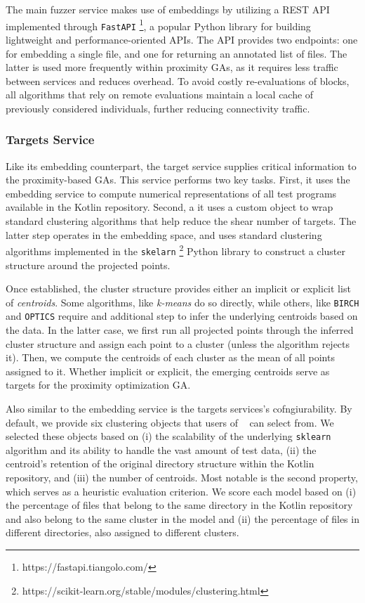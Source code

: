 The main fuzzer service makes use of embeddings
by utilizing a REST API implemented through \texttt{FastAPI}
\footnote{https://fastapi.tiangolo.com/}, a popular Python library
for building lightweight and performance-oriented APIs.
The API provides two endpoints: one for embedding a single file,
and one for returning an annotated list of files.
The latter is used more frequently within proximity \gls{GA}s,
as it requires less traffic between services and reduces overhead.
To avoid costly re-evaluations of blocks,
all algorithms that rely on remote evaluations maintain
a local cache of previously considered individuals,
further reducing connectivity traffic.

\subsubsection{Targets Service}

Like its embedding counterpart, the target service supplies
critical information to the proximity-based \gls{GA}s.
This service performs two key tasks.
First, it uses the embedding service to compute numerical representations
of all test programs available in the Kotlin repository.
Second, a it uses a custom object to wrap standard clustering algorithms that
help reduce the shear number of targets.
The latter step operates in the embedding space,
and uses standard clustering algorithms implemented in the 
\texttt{skelarn} \footnote{https://scikit-learn.org/stable/modules/clustering.html}
Python library to construct a cluster structure around the projected points.

Once established, the cluster structure provides either an implicit
or explicit list of \textit{centroids}.
Some algorithms, like \textit{k-means} do so directly, while others, 
like \texttt{BIRCH} \cite{zhang1996birch} and \texttt{OPTICS} \cite{ankerst1999optics}
require and additional step to infer the underlying centroids based on the data.
In the latter case, we first run all projected points through the
inferred cluster structure and assign
each point to a cluster (unless the algorithm rejects it).
Then, we compute the centroids of each cluster as the mean
of all points assigned to it.
Whether implicit or explicit, the emerging centroids
serve as targets for the proximity optimization \gls{GA}.

Also similar to the embedding service is the targets services's
cofngiurability.
By default, we provide six clustering objects that users of
\kf~ can select from.
We selected these objects based on (i) the scalability of the
underlying \texttt{sklearn} algorithm and its ability
to handle the vast amount of test data, (ii) the centroid's retention
of the original directory structure within the Kotlin repository, 
and (iii) the number of centroids.
Most notable is the second property, which serves
as a heuristic evaluation criterion.
We score each model based on (i) the percentage of files that belong to the 
same directory in the Kotlin repository and also belong to the same cluster in the model
and (ii) the percentage of files in different directories, also assigned to different clusters.


